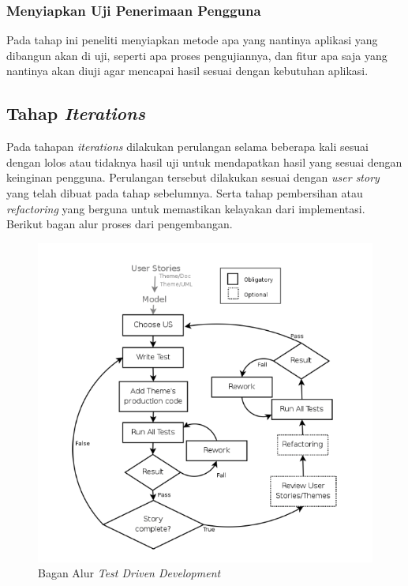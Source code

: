 \begin{spacing}{2}
    \subsubsection{Menyiapkan Uji Penerimaan Pengguna}
      Pada tahap ini peneliti menyiapkan metode apa yang nantinya aplikasi yang dibangun akan di uji, seperti apa proses pengujiannya, dan fitur apa saja yang nantinya akan diuji agar mencapai hasil sesuai dengan kebutuhan aplikasi.

  \subsection{Tahap \emph{Iterations}}
    Pada tahapan \emph{iterations} dilakukan perulangan selama beberapa kali sesuai dengan lolos atau tidaknya hasil uji untuk mendapatkan hasil yang sesuai dengan keinginan pengguna. Perulangan tersebut dilakukan sesuai dengan \emph{user story} yang telah dibuat pada tahap sebelumnya. Serta tahap pembersihan atau \emph{refactoring} yang berguna untuk memastikan kelayakan dari implementasi. Berikut bagan alur proses dari pengembangan.

    \begin{figure}[H]
      \centering
      \includegraphics[width=1\textwidth]{images/bagan-tdd}
      \caption{Bagan Alur \emph{Test Driven Development}}
      \label{bagan-tdd}
    \end{figure}


\end{spacing}
